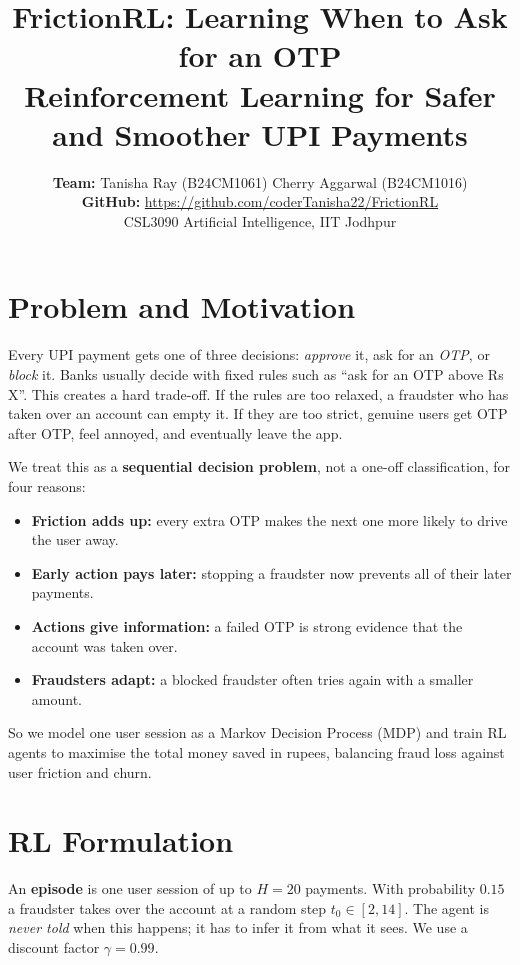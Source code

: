 \documentclass[10pt,twocolumn]{article}
\title{\vspace{-0.6in}\textbf{FrictionRL: Learning When to Ask for an OTP}\\[2pt]
\large Reinforcement Learning for Safer and Smoother UPI Payments}
\author{\textbf{Team:} Tanisha Ray (B24CM1061) \quad Cherry Aggarwal (B24CM1016)\\
\textbf{GitHub:} \url{https://github.com/coderTanisha22/FrictionRL}\\
\small CSL3090 Artificial Intelligence, IIT Jodhpur}
\date{\vspace{-0.4in}}
\begin{document}
\maketitle

\section{Problem and Motivation}
Every UPI payment gets one of three decisions: \emph{approve} it, ask for an \emph{OTP}, or \emph{block} it.
Banks usually decide with fixed rules such as ``ask for an OTP above Rs\,X''. This creates a hard trade-off.
If the rules are too relaxed, a fraudster who has taken over an account can empty it. If they are too strict,
genuine users get OTP after OTP, feel annoyed, and eventually leave the app.

We treat this as a \textbf{sequential decision problem}, not a one-off classification, for four reasons:
\begin{itemize}
\item \textbf{Friction adds up:} every extra OTP makes the next one more likely to drive the user away.
\item \textbf{Early action pays later:} stopping a fraudster now prevents all of their later payments.
\item \textbf{Actions give information:} a failed OTP is strong evidence that the account was taken over.
\item \textbf{Fraudsters adapt:} a blocked fraudster often tries again with a smaller amount.
\end{itemize}
So we model one user session as a Markov Decision Process (MDP) and train RL agents to maximise the total
money saved in rupees, balancing fraud loss against user friction and churn.

\section{RL Formulation}
An \textbf{episode} is one user session of up to $H{=}20$ payments. With probability $0.15$ a fraudster takes
over the account at a random step $t_0\in[2,14]$. The agent is \emph{never told} when this happens; it has to
infer it from what it sees. We use a discount factor $\gamma{=}0.99$.
\end{document}
